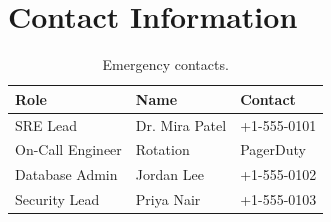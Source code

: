 \documentclass[
    language=english,
    doctype=manual,
    institution=none,
    titlestyle=book,
    oneside,
]{omnilatex}
\begin{document}
\chapter{Contact Information}
\label{sec:contacts}

\begin{table}[htbp]
    \centering
    \caption{Emergency contacts.}
    \label{tab:contacts}
    \begin{tabular}{@{}lll@{}}
        \toprule
        Role & Name & Contact \\
        \midrule
        SRE Lead & Dr. Mira Patel & +1-555-0101 \\
        On-Call Engineer & Rotation & PagerDuty \\
        Database Admin & Jordan Lee & +1-555-0102 \\
        Security Lead & Priya Nair & +1-555-0103 \\
        \bottomrule
    \end{tabular}
\end{table}

\printbibliography[heading=bibintoc, title={References}]
\end{document}
